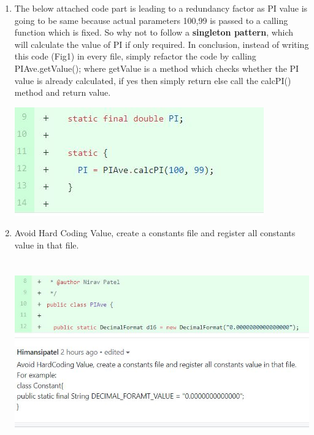 \documentclass[a4paper,11pt]{report}
\begin{document}
\begin{enumerate}

    \item The below attached code part is leading to a redundancy factor as PI value is going to be same because actual parameters 100,99 is passed to a calling function which is fixed. So why not to follow a \textbf{singleton pattern}, which will calculate the value of PI if only required. In conclusion, instead of writing this code (Fig1) in every file, simply refactor the code by calling PIAve.getValue(); where getValue is a method which checks whether the PI value is already calculated, if yes then simply return else call the calcPI() method and return value.
    \begin{center}
    \includegraphics{Image/Singleton.JPG}
    \end{center}
    
    \item Avoid Hard Coding Value, create a constants file and register all constants value in that file.  
    \begin{center}
    \includegraphics[width=14cm, height=8cm]{Image/hardcodedvalue.JPG}
    \end{center}
   

\end{enumerate}
\end{document}
